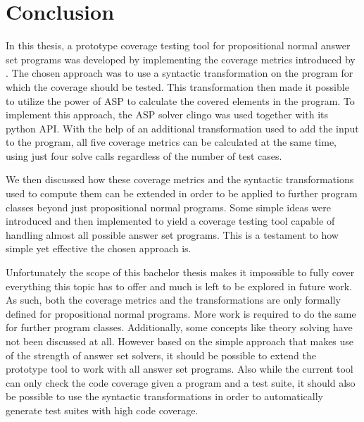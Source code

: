 
\chapter{Conclusion}
\label{ch:Conclusion}
In this thesis, a prototype coverage testing tool for propositional normal answer set programs was developed by implementing the coverage metrics introduced by \textcite{Jan+10}. The chosen approach was to use a syntactic transformation on the program for which the coverage should be tested. This transformation then made it possible to utilize the power of ASP to calculate the covered elements in the program. To implement this approach, the ASP solver clingo was used together with its python API. With the help of an additional transformation used to add the input to the program, all five coverage metrics can be calculated at the same time, using just four solve calls regardless of the number of test cases.

We then discussed how these coverage metrics and the syntactic transformations used to compute them can be extended in order to be applied to further program classes beyond just propositional normal programs. Some simple ideas were introduced and then implemented to yield a coverage testing tool capable of handling almost all possible answer set programs. This is a testament to how simple yet effective the chosen approach is.

Unfortunately the scope of this bachelor thesis makes it impossible to fully cover everything this topic has to offer and much is left to be explored in future work. As such, both the coverage metrics and the transformations are only formally defined for propositional normal programs. More work is required to do the same for further program classes. Additionally, some concepts like theory solving have not been discussed at all. However based on the simple approach that makes use of the strength of answer set solvers, it should be possible to extend the prototype tool to work with all answer set programs. Also while the current tool can only check the code coverage given a program and a test suite, it should also be possible to use the syntactic transformations in order to automatically generate test suites with high code coverage.

